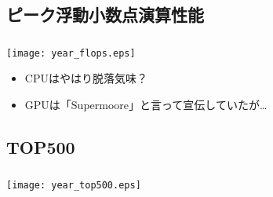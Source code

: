 \documentclass{beamer}  %
\theoremstyle{example}
\begin{document}
\subsection{ピーク浮動小数点演算性能}          
\begin{frame}\frametitle{\insertsubsection}
\begin{center}
\texttt{[image: year\_flops.eps]}
\end{center}
\begin{itemize}
\item CPUはやはり脱落気味？\pause
\item GPUは「Supermoore」と言って宣伝していたが…
\end{itemize}
\end{frame}

\subsection{TOP500}          
\begin{frame}\frametitle{\insertsubsection}
\begin{center}
\texttt{[image: year\_top500.eps]}
\end{center}
\end{frame}
\end{document}

